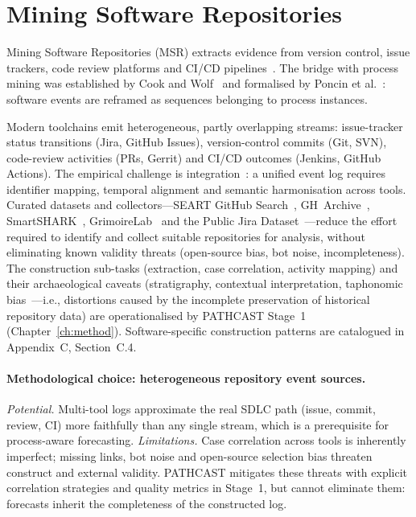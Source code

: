 \section{Mining Software Repositories}
\label{sec:msr}

Mining Software Repositories (MSR) extracts evidence from version control,
issue trackers, code review platforms and CI/CD pipelines~\cite{hassan2008road,
kagdi2007}. The bridge with process mining was established by Cook and
Wolf~\cite{cook1998} and formalised by Poncin et al.~\cite{poncin2011process}:
software events are reframed as sequences belonging to process instances.

Modern toolchains emit heterogeneous, partly overlapping streams:
issue-tracker status transitions (Jira, GitHub Issues), version-control
commits (Git, SVN), code-review activities (PRs, Gerrit) and CI/CD
outcomes (Jenkins, GitHub Actions). The empirical challenge is
integration~\cite{kochhar2019moving, Dixit2021}: a unified event log
requires identifier mapping, temporal alignment and semantic
harmonisation across tools. Curated datasets and collectors---SEART GitHub
Search~\cite{seart2021}, GH~Archive~\cite{gharchive2023},
SmartSHARK~\cite{trautsch2020smartshark},
GrimoireLab~\cite{dueenas2021grimoirelab} and the Public Jira
Dataset~\cite{montgomery2022jira}---reduce the effort required to identify
and collect suitable repositories for analysis, without eliminating known
validity threats (open-source bias, bot noise, incompleteness). The
construction sub-tasks (extraction, case correlation, activity mapping) and
their archaeological caveats (stratigraphy, contextual interpretation,
taphonomic bias~\cite{Zimmermann2005MiningVersionHistories}---i.e.,
distortions caused by the incomplete preservation of historical repository
data) are operationalised by
PATHCAST Stage~1 (Chapter~\ref{ch:method}). Software-specific construction
patterns are catalogued in Appendix~C, Section~C.4.

\paragraph{Methodological choice: heterogeneous repository event sources.}
\emph{Potential.} Multi-tool logs approximate the real SDLC path (issue,
commit, review, CI) more faithfully than any single stream, which is a
prerequisite for process-aware forecasting.
\emph{Limitations.} Case correlation across tools is inherently imperfect;
missing links, bot noise and open-source selection bias threaten construct
and external validity. PATHCAST mitigates these threats with explicit
correlation strategies and quality metrics in Stage~1, but cannot eliminate
them: forecasts inherit the completeness of the constructed log.



